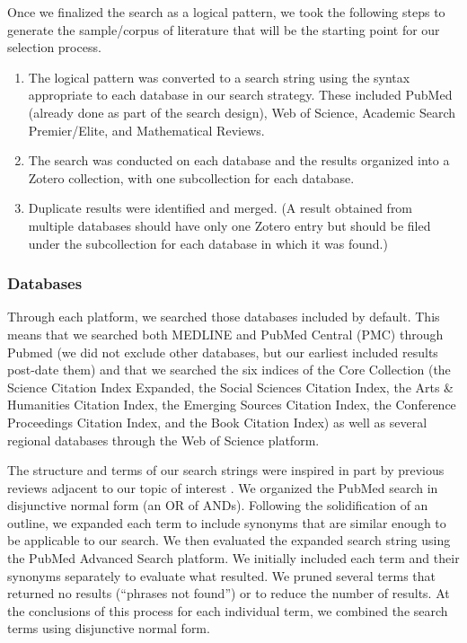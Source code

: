 \documentclass[sn-mathphys,Numbered,pdflatex]{sn-jnl}
\theoremstyle{remark}
\theoremstyle{definition}
\newcommand{\hl}[1]{#1}
\providecommand{\tightlist}{%
  \setlength{\itemsep}{0pt}\setlength{\parskip}{0pt}}
\begin{document}
Once we \hl{finalized} the search as a logical pattern, we \hl{took} the
following steps to generate the sample/corpus of literature that will be
the starting point for our selection process.

\begin{enumerate}
\def\labelenumi{\arabic{enumi}.}
\tightlist
\item
  The logical pattern \hl{was} converted to a search string using the
  syntax appropriate to each database in our search strategy. These
  include\hl{d} PubMed (already done as part of the search design), Web of
  Science, Academic Search Premier/Elite, and Mathematical Reviews.
\item
  The search \hl{was} conducted on each database and the results
  organized into a Zotero collection, with one subcollection for each
  database.
\item
  Duplicate results \hl{were} identified and merged. (A result obtained
  from multiple databases should have only one Zotero entry but should
  be filed under the subcollection for each database in which it was
  found.)
\end{enumerate}

\subsubsection{\texorpdfstring{\hl{Databases}}{}}\label{section-2}

\hl{Through each platform, we searched those databases included by default.
This means that we searched both MEDLINE and PubMed Central (PMC) through Pubmed (we did not exclude other databases, but our earliest included results post-date them) and that we searched the six indices of the Core Collection (the Science Citation Index Expanded, the Social Sciences Citation Index, the Arts \& Humanities Citation Index, the Emerging Sources Citation Index, the Conference Proceedings Citation Index, and the Book Citation Index) as well as several regional databases through the Web of Science platform.}

\hl{The structure and terms of our search strings were inspired in part by previous reviews adjacent to our topic of interest }\citep{Sharafoddini2017, Parimbelli2018}\hl{. We organized the PubMed search in disjunctive normal form (an OR of ANDs). Following the solidification of an outline, we expanded each term to include synonyms that are similar enough to be applicable to our search. We then evaluated the expanded search string using the PubMed Advanced Search platform. We initially included each term and their synonyms separately to evaluate what resulted. We pruned several terms that returned no results (``phrases not found'') or to reduce the number of results. At the conclusions of this process for each individual term, we combined the search terms using disjunctive normal form.}
\end{document}
